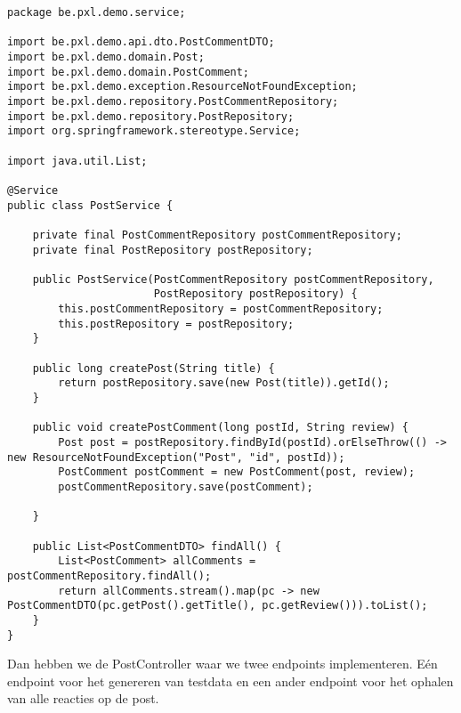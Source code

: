 \begin{lstlisting}
package be.pxl.demo.service;

import be.pxl.demo.api.dto.PostCommentDTO;
import be.pxl.demo.domain.Post;
import be.pxl.demo.domain.PostComment;
import be.pxl.demo.exception.ResourceNotFoundException;
import be.pxl.demo.repository.PostCommentRepository;
import be.pxl.demo.repository.PostRepository;
import org.springframework.stereotype.Service;

import java.util.List;

@Service
public class PostService {

    private final PostCommentRepository postCommentRepository;
    private final PostRepository postRepository;

    public PostService(PostCommentRepository postCommentRepository,
                       PostRepository postRepository) {
        this.postCommentRepository = postCommentRepository;
        this.postRepository = postRepository;
    }

    public long createPost(String title) {
        return postRepository.save(new Post(title)).getId();
    }

    public void createPostComment(long postId, String review) {
        Post post = postRepository.findById(postId).orElseThrow(() -> new ResourceNotFoundException("Post", "id", postId));
        PostComment postComment = new PostComment(post, review);
        postCommentRepository.save(postComment);

    }

    public List<PostCommentDTO> findAll() {
        List<PostComment> allComments = postCommentRepository.findAll();
        return allComments.stream().map(pc -> new PostCommentDTO(pc.getPost().getTitle(), pc.getReview())).toList();
    }
}
\end{lstlisting}

Dan hebben we de PostController waar we twee endpoints implementeren. Eén endpoint voor het genereren van testdata en een ander endpoint voor het ophalen van alle reacties op de post.

